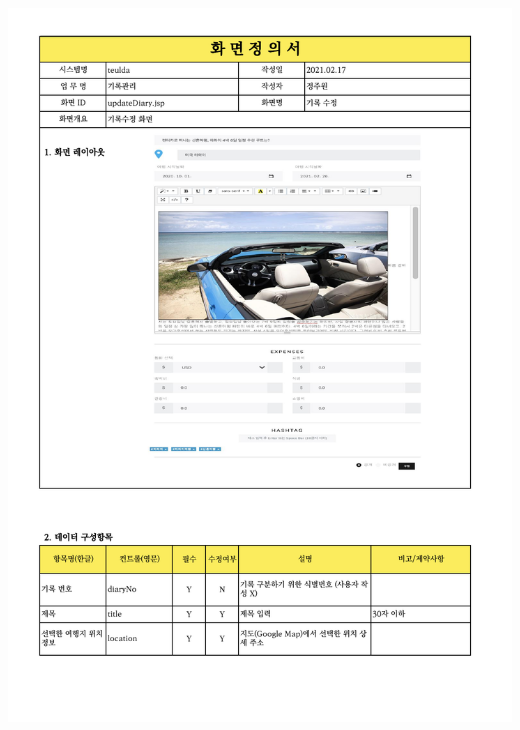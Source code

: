 {{{{{{{{{{{{{{{{{{{{{{{{{{{{\includegraphics[width=20cm]{./Figure/Design/Display/diary/diary_10.pdf} \\
}}}}}}}}}}}}}}}}}}}}}}}}}}}}
